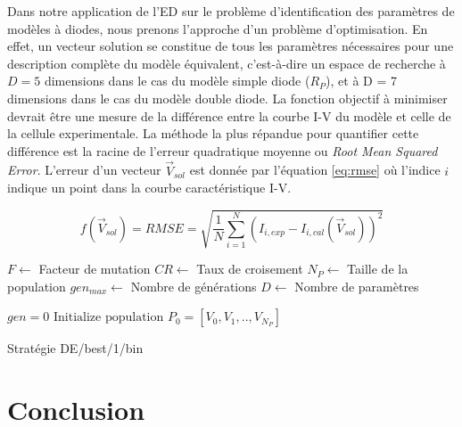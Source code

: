 Dans notre application de l'ED sur le problème d'identification des paramètres de modèles à diodes, nous prenons l'approche d'un problème d'optimisation. En effet, un vecteur solution se constitue de tous les paramètres nécessaires pour une description complète du modèle équivalent, c'est-à-dire un espace de recherche à $D = 5$ dimensions dans le cas du modèle simple diode ($R_P$), et à D = 7 dimensions dans le cas du modèle double diode. La fonction objectif à minimiser devrait être une mesure de la différence entre la courbe I-V du modèle et celle de la cellule experimentale. La méthode la plus répandue pour quantifier cette différence est la racine de l'erreur quadratique moyenne ou \textit{Root Mean Squared Error}. L'erreur d'un vecteur $\vec{V}_{sol}$ est donnée par l'équation \ref{eq:rmse} où l'indice $i$ indique un point dans la courbe caractéristique I-V.

\begin{equation}
  \label{eq:rmse}
  f(\vec{V}_{sol}) = RMSE = \sqrt{\frac{1}{N} \sum_{i = 1}^{N} (I_{i,exp} - I_{i, cal}(\vec{V}_{sol}))^2 }
\end{equation}

\begin{algorithm}
  $F \gets$ Facteur de mutation\;
  $CR \gets$ Taux de croisement\;
  $N_P \gets$ Taille de la population\;
  $gen_{max} \gets$ Nombre de générations\;
  $D \gets $ Nombre de paramètres\;
  
  $gen = 0$\;
  $\text{Initialize population\ } P_0 = [V_0, V_1, .., V_{N_P}]$\;
  \caption{Stratégie DE/best/1/bin}
  \label{alg:debestbin}
\end{algorithm}



\section{Conclusion}
